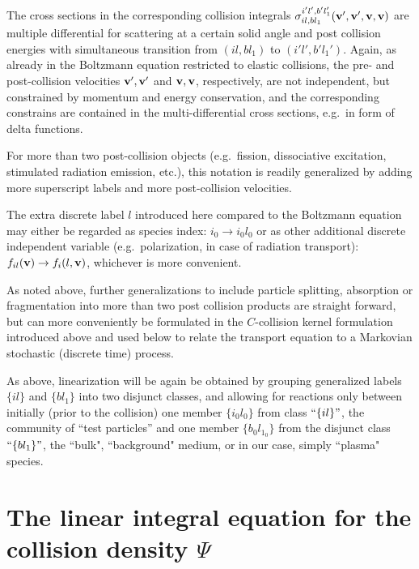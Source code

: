 The cross sections in the corresponding collision integrals
$\sigma_{il,bl_1}^{i'l',b'l_1'}(\mathbf{v}',\mathbf{v}',\mathbf{v},\mathbf{v})$ are multiple differential
for scattering at a certain solid angle and post collision energies with
simultaneous transition from $(il, bl_1)$ to $(i'l',b'l_1')$.
Again, as already in the Boltzmann equation restricted to elastic collisions,
the pre- and post-collision velocities $\mathbf{v}',\mathbf{v}'$ and $\mathbf{v},\mathbf{v}$, respectively,
are not independent, but constrained by momentum and energy conservation, and
the corresponding constrains are contained in the multi-differential cross
sections, e.g.\ in form of delta functions.

For more than two post-collision objects (e.g.\ fission, dissociative
excitation, stimulated radiation emission, etc.), this notation is readily
generalized by adding more superscript labels and more post-collision
velocities.

The extra discrete label $l$ introduced here compared to the Boltzmann equation
may either be regarded as species index:
$i_0 \rightarrow i_0l_0$ or as other additional discrete independent variable
(e.g.\ polarization, in case of radiation transport):
$f_{il}(\mathbf{v}) \rightarrow f_{i}(l,\mathbf{v})$, whichever is more convenient.

As noted above, further generalizations to include particle splitting,
absorption or fragmentation into more than two post collision products are
straight forward, but can more conveniently be formulated in the $C$-collision
kernel formulation introduced above and used below to relate the transport
equation to a Markovian stochastic (discrete time) process.


\vspace{1em}

As above, linearization will be again be obtained by grouping generalized
labels $\{il\}$ and $\{bl_1\}$ into two disjunct classes, and allowing for
reactions only between initially (prior to the collision) one member
$\{i_0l_0\}$ from class $``\{il\}"$, the community of ``test particles'' and
one member $\{b_0l_{1_0}\}$ from the disjunct class $``\{bl_1\}"$, the ``bulk",
``background" medium, or in our case, simply ``plasma" species.

\section{The linear integral equation for the collision density
  \texorpdfstring{$\Psi$}{psi}} \label{sec1.1}

